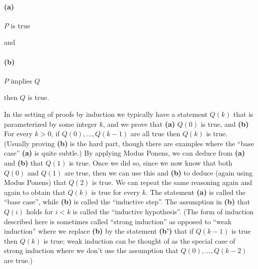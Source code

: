 \paragraph{(a)} \(P\) is true

and

\paragraph{(b)} \(P\) implies \(Q\)

then \(Q\) is true.

In the setting of proofs by induction we typically have a statement
\(Q(k)\) that is parameterized by some integer \(k\), and we prove that
\textbf{(a)} \(Q(0)\) is true, and \textbf{(b)} For every \(k>0\), if
\(Q(0),\ldots,Q(k-1)\) are all true then \(Q(k)\) is true. (Usually
proving \textbf{(b)} is the hard part, though there are examples where
the ``base case'' \textbf{(a)} is quite subtle.) By applying Modus
Ponens, we can deduce from \textbf{(a)} and \textbf{(b)} that \(Q(1)\)
is true. Once we did so, since we now know that both \(Q(0)\) and
\(Q(1)\) are true, then we can use this and \textbf{(b)} to deduce
(again using Modus Ponens) that \(Q(2)\) is true. We can repeat the same
reasoning again and again to obtain that \(Q(k)\) is true for every
\(k\). The statement \textbf{(a)} is called the ``base case'', while
\textbf{(b)} is called the ``inductive step''. The assumption in
\textbf{(b)} that \(Q(i)\) holds for \(i<k\) is called the ``inductive
hypothesis''. (The form of induction described here is sometimes called
``strong induction'' as opposed to ``weak induction'' where we replace
\textbf{(b)} by the statement \textbf{(b')} that if \(Q(k-1)\) is true
then \(Q(k)\) is true; weak induction can be thought of as the special
case of strong induction where we don't use the assumption that
\(Q(0),\ldots,Q(k-2)\) are true.)

